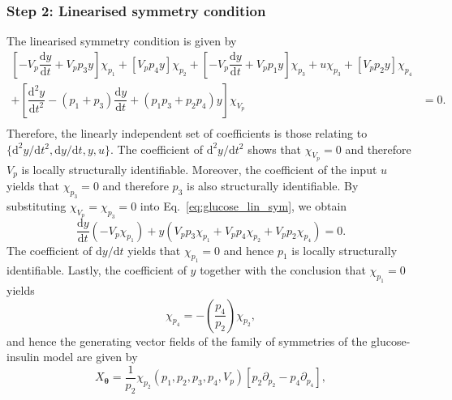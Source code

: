 \documentclass[12pt]{article}
\begin{document}
{\subsubsection*{Step 2: Linearised symmetry condition}
The linearised symmetry condition is given by
\begin{equation}
\begin{split}
\left[-V_{p}\dfrac{\mathrm{d}y}{\mathrm{d}t}+V_{p}p_{3}y\right]\chi_{p_{1}}+[V_{p}p_{4}y]\chi_{p_{2}}+\left[-V_{p}\dfrac{\mathrm{d}y}{\mathrm{d}t}+V_{p}p_{1}y\right]\chi_{p_{3}}+u\chi_{p_{3}}+\left[V_{p}p_{2}y\right]\chi_{p_{4}}&\\
+\left[\dfrac{\mathrm{d}^{2}y}{\mathrm{d}t^{2}}-(p_{1}+p_{3})\dfrac{\mathrm{d}y}{\mathrm{d}t}+(p_{1}p_{3}+p_{2}p_{4})y\right]\chi_{V_{p}}&=0.\\
\end{split}
    \label{eq:glucose_lin_sym}
\end{equation}
Therefore, the linearly independent set of coefficients is those relating to $\{\mathrm{d}^{2}y/\mathrm{d}t^{2},\mathrm{d}y/\mathrm{d}t,y,u\}$. The coefficient of $\mathrm{d}^{2}y/\mathrm{d}t^{2}$ shows that $\chi_{V_{p}}=0$ and therefore $V_{p}$ is locally structurally identifiable. Moreover, the coefficient of the input $u$ yields that $\chi_{p_{3}}=0$ and therefore $p_{3}$ is also structurally identifiable. By substituting $\chi_{V_{p}}=\chi_{p_{3}}=0$ into Eq.~\eqref{eq:glucose_lin_sym}, we obtain 
\begin{equation}
    \dfrac{\mathrm{d}y}{\mathrm{d}t}\left(-V_{p}\chi_{p_{1}}\right)+y\left(V_{p}p_{3}\chi_{p_{1}}+V_{p}p_{4}\chi_{p_{2}}+V_{p}p_{2}\chi_{p_{4}}\right)=0.
    \label{eq:glucose_lin_sym_2}
\end{equation}
The coefficient of $\mathrm{d}y/\mathrm{d}t$ yields that $\chi_{p_{1}}=0$ and hence $p_{1}$ is locally structurally identifiable. Lastly, the coefficient of $y$ together with the conclusion that $\chi_{p_{1}}=0$ yields 
\begin{equation}
    \chi_{p_{4}}=-\left(\frac{p_{4}}{p_{2}}\right)\chi_{p_{2}},
    \label{eq:glucose_lin_sym_3}
\end{equation}
and hence the generating vector fields of the family of symmetries of the glucose-insulin model are given by
\begin{equation}
    X_{\boldsymbol{\theta}}=\frac{1}{p_{2}}\chi_{p_{2}}\left(p_{1},p_{2},p_{3},p_{4},V_{p}\right)\left[p_{2}\partial_{p_{2}}-p_{4}\partial_{p_{4}}\right],
    \label{eq:X_glucose}
\end{equation}
}
\end{document}
